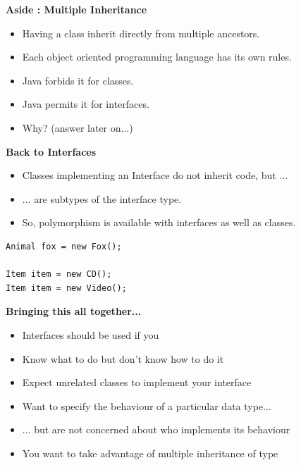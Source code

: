 \documentclass{beamer}
\begin{document}
\begin{frame}
\begin{center}
\textbf{Aside : Multiple Inheritance}
\end{center}
\begin{itemize}
\item Having a class inherit directly from multiple ancestors.
\item Each object oriented programming language has its own rules.
\item Java forbids it for classes.
\item Java permits it for interfaces.
\bigskip
\item Why? (answer later on...)
\end{itemize}
\end{frame}

\begin{frame}[fragile]
\begin{center}
\textbf{Back to Interfaces}
\end{center}
\begin{itemize}
\item Classes implementing an Interface do not inherit code, but ...
\item ... are subtypes of the interface type.
\item So, polymorphism is available with interfaces as well as classes.
\end{itemize}
\begin{block}{}
\begin{lstlisting}
Animal fox = new Fox();

Item item = new CD();
Item item = new Video();
\end{lstlisting}
\end{block}
\end{frame}

\begin{frame}
\begin{center}
\textbf{Bringing this all together...}
\end{center}
\begin{itemize}
\item Interfaces should be used if you
\bigskip
\item Know what to do but don't know how to do it
\item Expect unrelated classes to implement your interface
\item Want to specify the behaviour of a particular data type...
\item ... but are not concerned about who implements its behaviour
\item You want to take advantage of multiple inheritance of type
\end{itemize}
\end{frame}
\end{document}
